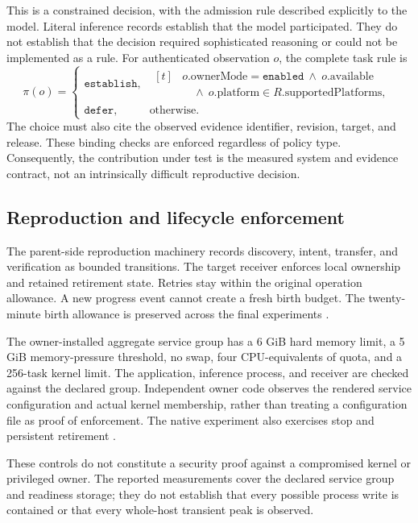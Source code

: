 \documentclass[11pt,letterpaper]{article}
\begin{document}
This is a constrained decision, with the admission rule described explicitly
to the model. Literal inference records establish that the model participated.
They do not establish that the decision required sophisticated reasoning or
could not be implemented as a rule.
For authenticated observation $o$, the complete task rule is
\[
\pi(o)=
\begin{cases}
\texttt{establish},&
\begin{aligned}[t]
&o.\text{ownerMode}=\texttt{enabled}\ \land\ o.\text{available}\\
&\quad\land\ o.\text{platform}\in R.\text{supportedPlatforms},
\end{aligned}\\[3pt]
\texttt{defer},&\text{otherwise}.
\end{cases}
\]
The choice must also cite the observed evidence identifier, revision, target,
and release. These binding checks are enforced regardless of policy type.
Consequently, the contribution under test is the measured system and evidence
contract, not an intrinsically difficult reproductive decision.

\subsection{Reproduction and lifecycle enforcement}

The parent-side reproduction machinery records discovery, intent, transfer,
and verification as bounded transitions. The target receiver enforces local
ownership and retained retirement state. Retries stay within the original
operation allowance. A new progress event cannot create a fresh birth budget.
The twenty-minute birth allowance is preserved across the final experiments
\cite{implementation,reduced}.

The owner-installed aggregate service group has a 6 GiB hard memory limit,
a 5 GiB memory-pressure threshold, no swap, four CPU-equivalents of quota,
and a 256-task kernel limit. The application, inference process, and receiver
are checked against the declared group. Independent owner code observes the
rendered service configuration and actual kernel membership, rather than
treating a configuration file as proof of enforcement. The native experiment
also exercises stop and persistent retirement \cite{implementation,native}.

These controls do not constitute a security proof against a compromised
kernel or privileged owner. The reported measurements cover the declared
service group and readiness storage; they do not establish that every possible
process write is contained or that every whole-host transient peak is observed.
\end{document}
